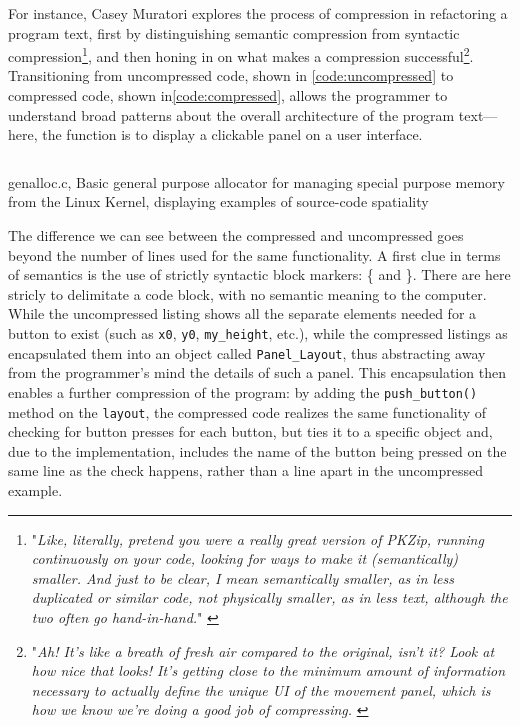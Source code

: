 For instance, Casey Muratori explores the process of compression in refactoring a program text, first by distinguishing semantic compression from syntactic compression\footnote{"\emph{Like, literally, pretend you were a really great version of PKZip, running continuously on your code, looking for ways to make it (semantically) smaller. And just to be clear, I mean semantically smaller, as in less duplicated or similar code, not physically smaller, as in less text, although the two often go hand-in-hand.}" \citep{muratori_semantic_2014}}, and then honing in on what makes a compression successful\footnote{"\emph{Ah! It's like a breath of fresh air compared to the original, isn't it? Look at how nice that looks! It's getting close to the minimum amount of information necessary to actually define the unique UI of the movement panel, which is how we know we're doing a good job of compressing.} \citep{muratori_semantic_2014}}. Transitioning from uncompressed code, shown in \ref{code:uncompressed} to compressed code, shown in\ref{code:compressed}, allows the programmer to understand broad patterns about the overall architecture of the program text—here, the function is to display a clickable panel on a user interface.

\begin{listing}
    \inputminted[]{c}{./corpus/uncompressed.c}
    \caption{genalloc.c, Basic general purpose allocator for managing special purpose memory from the Linux Kernel, displaying examples of source-code spatiality \citep{muratori_semantic_2014}}
    \label{code:uncompressed}
\end{listing}

The difference we can see between the compressed and uncompressed goes beyond the number of lines used for the same functionality. A first clue in terms of semantics is the use of strictly syntactic block markers: \{ and \}. There are here stricly to delimitate a code block, with no semantic meaning to the computer. While the uncompressed listing shows all the separate elements needed for a button to exist (such as \lstinline{x0}, \lstinline{y0}, \lstinline{my_height}, etc.), while the compressed listings as encapsulated them into an object called \lstinline{Panel_Layout}, thus abstracting away from the programmer's mind the details of such a panel. This encapsulation then enables a further compression of the program: by adding the \lstinline{push_button()} method on the \lstinline{layout}, the compressed code realizes the same functionality of checking for button presses for each button, but ties it to a specific object and, due to the implementation, includes the name of the button being pressed on the same line as the check happens, rather than a line apart in the uncompressed example.

